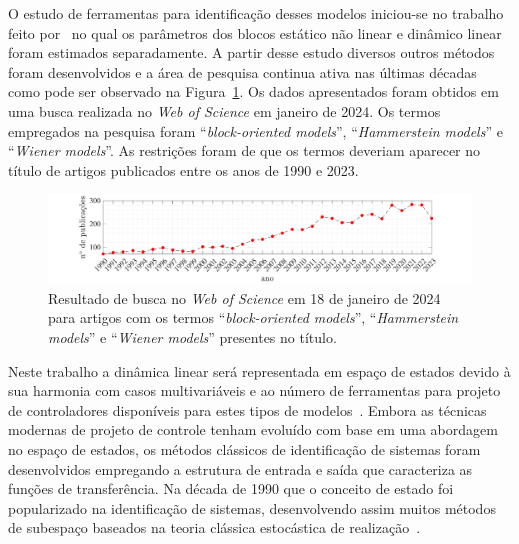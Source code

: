 \par 
O estudo de ferramentas para identificação desses modelos iniciou-se no trabalho feito por~\cite{narendra1966} no qual os parâmetros dos blocos estático não linear e dinâmico linear foram estimados separadamente. A partir desse estudo diversos outros métodos foram desenvolvidos e a área de pesquisa continua ativa nas últimas décadas como pode ser observado na Figura~\ref{fig:wos}. Os dados apresentados foram obtidos em uma busca realizada no \textit{Web of Science} em janeiro de 2024. Os termos empregados na pesquisa foram ``\textit{block-oriented models}'', ``\textit{Hammerstein models}'' e ``\textit{Wiener models}''. As restrições foram de que os termos deveriam aparecer no título de artigos publicados entre os anos de 1990 e 2023.
%
\begin{figure}[htb]
	\centering
	\includegraphics[scale=0.58,trim=20mm 0mm 0mm 0mm,clip=true]{figuras/wosblockoriented}
	\caption[Resultado da busca ``\textit{block-oriented models}'', ``\textit{Hammerstein models}'' e ``\textit{Wiener models}'' no \textit{Web of Science} em 18 de janeiro de 2024.]{Resultado de busca no \textit{Web of Science} em 18 de janeiro de 2024 para artigos com os termos ``\textit{block-oriented models}'', ``\textit{Hammerstein models}'' e ``\textit{Wiener models}'' presentes no título.}
	\label{fig:wos}
\end{figure}
%
\par 
Neste trabalho a dinâmica linear será representada em espaço de estados devido à sua harmonia com casos multivariáveis e ao número de ferramentas para projeto de controladores disponíveis para estes tipos de modelos~\citep{bai2010,borjas2012}. Embora as técnicas modernas de projeto de controle tenham evoluído com base em uma abordagem no espaço de estados, os métodos clássicos de identificação de sistemas foram desenvolvidos empregando a estrutura de entrada e saída que caracteriza as funções de transferência. Na década de 1990 que o conceito de estado foi popularizado na identificação de sistemas, desenvolvendo assim muitos métodos de subespaço baseados na teoria clássica estocástica de realização~\citep{verhaegen1992a,verhaegen1992b,van1994,katayama2005}.
\par 
